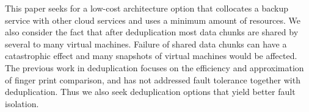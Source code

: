 This paper seeks for a low-cost architecture option  that collocates
a backup service with other cloud services and  uses a minimum amount of resources. 
We also consider the fact that after
deduplication most data chunks are shared by several to many virtual machines.
Failure of shared data chunks can have a catastrophic effect and many
snapshots of virtual machines would be affected.
The previous work in deduplication focuses on the efficiency and approximation of
finger print comparison, and has not addressed fault tolerance together with deduplication.
Thus we also seek deduplication options that yield better fault isolation.


